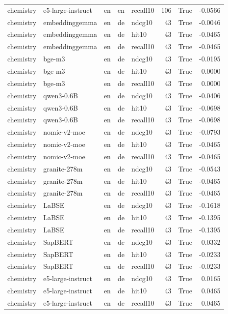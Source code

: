 \begin{tabular}{lllllrrr}
chemistry & e5-large-instruct & en & en & recall10 & 106 & True & -0.0566 \\
chemistry & embeddinggemma & en & de & ndcg10 & 43 & True & -0.0046 \\
chemistry & embeddinggemma & en & de & hit10 & 43 & True & -0.0465 \\
chemistry & embeddinggemma & en & de & recall10 & 43 & True & -0.0465 \\
chemistry & bge-m3 & en & de & ndcg10 & 43 & True & -0.0195 \\
chemistry & bge-m3 & en & de & hit10 & 43 & True & 0.0000 \\
chemistry & bge-m3 & en & de & recall10 & 43 & True & 0.0000 \\
chemistry & qwen3-0.6B & en & de & ndcg10 & 43 & True & -0.0406 \\
chemistry & qwen3-0.6B & en & de & hit10 & 43 & True & -0.0698 \\
chemistry & qwen3-0.6B & en & de & recall10 & 43 & True & -0.0698 \\
chemistry & nomic-v2-moe & en & de & ndcg10 & 43 & True & -0.0793 \\
chemistry & nomic-v2-moe & en & de & hit10 & 43 & True & -0.0465 \\
chemistry & nomic-v2-moe & en & de & recall10 & 43 & True & -0.0465 \\
chemistry & granite-278m & en & de & ndcg10 & 43 & True & -0.0543 \\
chemistry & granite-278m & en & de & hit10 & 43 & True & -0.0465 \\
chemistry & granite-278m & en & de & recall10 & 43 & True & -0.0465 \\
chemistry & LaBSE & en & de & ndcg10 & 43 & True & -0.1618 \\
chemistry & LaBSE & en & de & hit10 & 43 & True & -0.1395 \\
chemistry & LaBSE & en & de & recall10 & 43 & True & -0.1395 \\
chemistry & SapBERT & en & de & ndcg10 & 43 & True & -0.0332 \\
chemistry & SapBERT & en & de & hit10 & 43 & True & -0.0233 \\
chemistry & SapBERT & en & de & recall10 & 43 & True & -0.0233 \\
chemistry & e5-large-instruct & en & de & ndcg10 & 43 & True & 0.0165 \\
chemistry & e5-large-instruct & en & de & hit10 & 43 & True & 0.0465 \\
chemistry & e5-large-instruct & en & de & recall10 & 43 & True & 0.0465 \\

\end{tabular}
